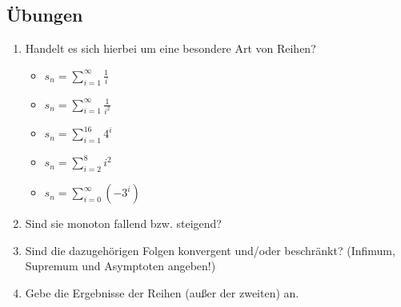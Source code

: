 \subsection{Übungen}
\begin{enumerate}
\item Handelt es sich hierbei um eine besondere Art von Reihen?
\begin{itemize}
\item $ s_n = \sum\limits_{i=1}^{\infty} \frac{1}{i} $
\item $ s_n = \sum\limits_{i=1}^{\infty} \frac{1}{i^2} $
\item $ s_n = \sum\limits_{i=1}^{16} 4^i$
\item $ s_n = \sum\limits_{i=2}^{8} i^2 $
\item $ s_n = \sum\limits_{i=0}^{\infty} (-3^i)$
\end{itemize}
\item Sind sie monoton fallend bzw. steigend?
\item Sind die dazugehörigen Folgen konvergent und/oder beschränkt? (Infimum, Supremum und Asymptoten angeben!)
\item Gebe die Ergebnisse der Reihen (außer der zweiten) an.
\end{enumerate}